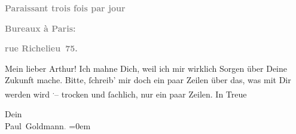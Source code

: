 \pstart
           \begin{otherlanguage}{french}\textcolor{gray}{\textbf{\textbf{Paraissant trois fois par jour}}}\end{otherlanguage}\pend
           
\pstart
           \begin{otherlanguage}{french}\textcolor{gray}{\textbf{\textbf{Bureaux à Paris:}}}\end{otherlanguage}\pend
           
\pstart
           \begin{otherlanguage}{french}\textcolor{gray}{\textbf{\textbf{rue Richelieu 75.}}}\end{otherlanguage}\pend
           
\pstart\center{}Mein lieber Arthur!\pend\vspace{0.5em}
\pstart
           Ich mahne Dich, weil ich mir wirklich Sorgen über Deine Zukunft mache. Bitte,{ }ſchreib’ mir doch ein paar Zeilen über das, was mit Dir werden wird \substVorne{}\textsuperscript{.}\substDazwischen{}–\substHinten{} trocken und{ }ſachlich, nur ein paar Zeilen. In Treue\pend
           
\pstart
           Dein {\\[\baselineskip]}\spacefill\mbox{Paul Goldmann\textcolor{gray}{.}}\pend
           \leftskip=0em{}\endnumbering{}  \newcommand{\dateiname}{L02707}\newcommand{\titel}{Paul Goldmann an Arthur Schnitzler, 9. 5. [1893]}\newcommand{\editorInnen}{Martin Anton Müller und Laura Untner}
